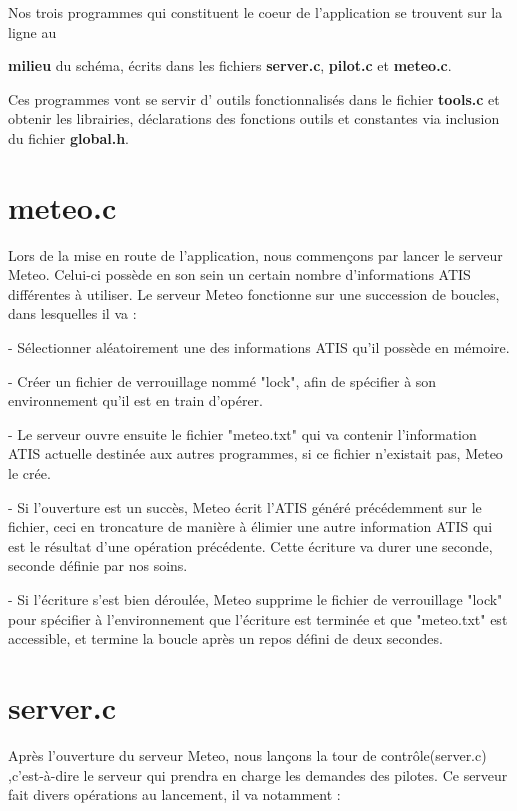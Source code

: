 \documentclass{report}
\begin{document}
		Nos trois programmes qui constituent le coeur de l'application se trouvent sur la ligne au {\textbf{milieu} du schéma, écrits dans les fichiers {\textbf{\color{red} server.c}}, {      \textbf{\color{red} pilot.c}} et {\textbf{\color{red} meteo.c}}.

		Ces programmes vont se servir d' \og outils \fg fonctionnalisés dans le fichier {\textbf{\color{red} tools.c}} et obtenir les librairies, déclarations des fonctions outils et constantes  via inclusion du fichier {\textbf{\color{black} global.h}}.

	\section{meteo.c}

		Lors de la mise en route de l'application, nous commençons par lancer le serveur Meteo.
		Celui-ci possède en son sein un certain nombre d'informations ATIS différentes à utiliser.
		Le serveur Meteo fonctionne sur une succession de boucles, dans lesquelles il va :

		- Sélectionner aléatoirement une des informations ATIS qu'il possède en mémoire.

		- Créer un fichier de verrouillage nommé "lock", afin de spécifier à son environnement qu'il est en train d'opérer.

		- Le serveur ouvre ensuite le fichier "meteo.txt" qui va contenir l'information ATIS actuelle destinée aux autres programmes, si ce fichier n'existait pas, Meteo le crée.

		- Si l'ouverture est un succès, Meteo écrit l'ATIS généré précédemment sur le fichier, ceci en troncature de manière à élimier une autre information ATIS qui est le résultat d'une opération précédente. Cette écriture va durer une seconde, seconde définie par nos soins.

		- Si l'écriture s'est bien déroulée, Meteo supprime le fichier de verrouillage "lock" pour spécifier à l'environnement que l'écriture est terminée et que "meteo.txt" est accessible, et termine la boucle après un repos défini de deux secondes.

	\section{server.c}

		Après l'ouverture du serveur Meteo, nous lançons la tour de contrôle(server.c) ,c'est-à-dire le serveur qui prendra en charge les demandes des pilotes.
		Ce serveur fait divers opérations au lancement, il va notamment : 

}
\end{document}
